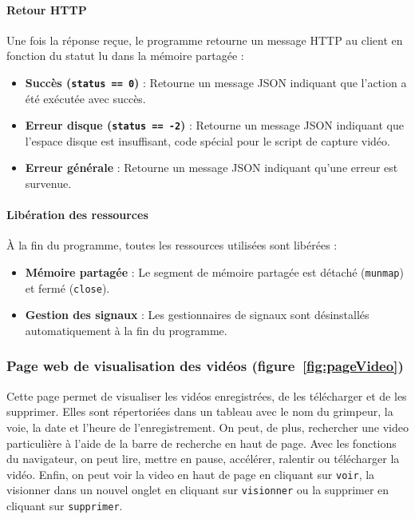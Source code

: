 \documentclass[a4paper, 11pt, french]{article}
\begin{document}
\paragraph{Retour HTTP}
Une fois la réponse reçue, le programme retourne un message HTTP au client en fonction du statut lu dans la mémoire partagée :
\begin{itemize}
    \item \textbf{Succès (\texttt{status == 0})} : Retourne un message JSON indiquant que l'action a été exécutée avec succès.
    \item \textbf{Erreur disque (\texttt{status == -2})} : Retourne un message JSON indiquant que l'espace disque est insuffisant, code spécial pour le script de capture vidéo.
    \item \textbf{Erreur générale} : Retourne un message JSON indiquant qu'une erreur est survenue.
\end{itemize}

\paragraph{Libération des ressources}
À la fin du programme, toutes les ressources utilisées sont libérées :
\begin{itemize}
    \item \textbf{Mémoire partagée} : Le segment de mémoire partagée est détaché (\texttt{munmap}) et fermé (\texttt{close}).
    \item \textbf{Gestion des signaux} : Les gestionnaires de signaux sont désinstallés automatiquement à la fin du programme.
\end{itemize}


\subsubsection{Page web de visualisation des vidéos (figure~\ref{fig:pageVideo})}
Cette page permet de visualiser les vidéos enregistrées, de les télécharger et de les supprimer. Elles sont répertoriées dans un tableau avec le nom du grimpeur, la voie, la date et l'heure de l'enregistrement. On peut, de plus, rechercher une video particulière à l'aide de la barre de recherche en haut de page. Avec les fonctions du navigateur, on peut lire, mettre en pause, accélérer, ralentir ou télécharger la vidéo. Enfin, on peut voir la video en haut de page en cliquant sur \texttt{voir}, la visionner dans un nouvel onglet en cliquant sur \texttt{visionner} ou la supprimer en cliquant sur \texttt{supprimer}.
\end{document}
